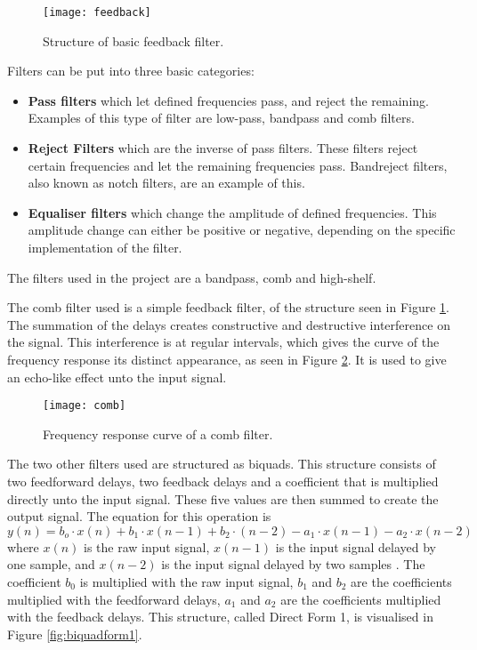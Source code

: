 \begin{figure}
\centering
\texttt{[image: feedback]}
\caption{Structure of basic feedback filter.}
\label{fig:feedback}
\end{figure}

Filters can be put into three basic categories:
\begin{itemize}
\item \textbf{Pass filters} which let defined frequencies pass, and reject the remaining. Examples of this type of filter are low-pass, bandpass and comb filters.
\item \textbf{Reject Filters} which are the inverse of pass filters. These filters reject certain frequencies and let the remaining frequencies pass. Bandreject filters, also known as notch filters, are an example of this.
\item \textbf{Equaliser filters} which change the amplitude of defined frequencies. This amplitude change can either be positive or negative, depending on the specific implementation of the filter. 
\end{itemize}

The filters used in the project are a bandpass, comb and high-shelf.

The comb filter used is a simple feedback filter, of the structure seen in Figure \ref{fig:feedback}. The summation of the delays creates constructive and destructive interference on the signal. This interference is at regular intervals, which gives the curve of the frequency response its distinct appearance, as seen in Figure \ref{fig:comb}. It is used to give an echo-like effect unto the input signal.

\begin{figure}
\centering
\texttt{[image: comb]}
\caption{Frequency response curve of a comb filter.}
\label{fig:comb}
\end{figure}

The two other filters used are structured as biquads. This structure consists of two feedforward delays, two feedback delays and a coefficient that is multiplied directly unto the input signal. These five values are then summed to create the output signal. The equation for this operation is 
\[y(n) = b_o \cdot x(n) + b_1 \cdot x(n-1) + b_2 \cdot (n-2) - a_1 \cdot x(n-1) - a_2 \cdot x(n-2)\]
where \(x(n)\) is the raw input signal, \(x(n-1)\) is the input signal delayed by one sample, and \(x(n-2)\) is the input signal delayed by two samples \cite{Redmon2003}. The coefficient \(b_0\) is multiplied with the raw input signal, \(b_1\) and \(b_2\) are the coefficients multiplied with the feedforward delays, \(a_1\) and \(a_2\) are the coefficients multiplied with the feedback delays. This structure, called Direct Form 1, is visualised in Figure \ref{fig:biquadform1}.

